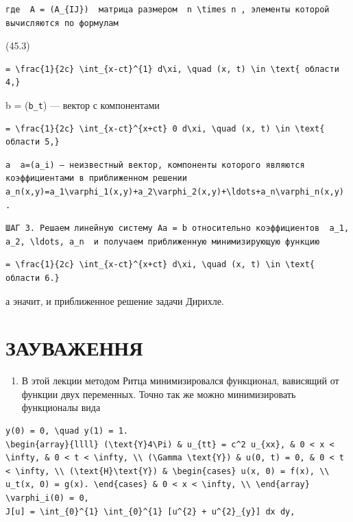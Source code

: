 \documentclass[
  ukrainian,
]{article}
\providecommand{\tightlist}{%
  \setlength{\itemsep}{0pt}\setlength{\parskip}{0pt}}
\begin{document}
\begin{verbatim}
где  A = (A_{IJ})  матрица размером  n \times n , элементы которой вычисляются по формулам
\end{verbatim}

(45.3)

\begin{verbatim}
= \frac{1}{2c} \int_{x-ct}^{1} d\xi, \quad (x, t) \in \text{ области 4,}
\end{verbatim}

b = (\texttt{b\_t}) --- вектор с компонентами

\begin{verbatim}
= \frac{1}{2c} \int_{x-ct}^{x+ct} 0 d\xi, \quad (x, t) \in \text{ области 5,}
\end{verbatim}

\begin{verbatim}
а  a=(a_i) — неизвестный вектор, компоненты которого являются коэффициентами в приближенном решении  a_n(x,y)=a_1\varphi_1(x,y)+a_2\varphi_2(x,y)+\ldots+a_n\varphi_n(x,y) .
\end{verbatim}

\begin{verbatim}
ШАГ 3. Решаем линейную систему Aa = b относительно коэффициентов  a_1, a_2, \ldots, a_n  и получаем приближенную минимизирующую функцию
\end{verbatim}

\begin{verbatim}
= \frac{1}{2c} \int_{x-ct}^{x+ct} d\xi, \quad (x, t) \in \text{ области 6.}
\end{verbatim}

а эначит, и приближенное решение задачи Дирихле.

\section{ЗАУВАЖЕННЯ}\label{ux437ux430ux443ux432ux430ux436ux435ux43dux43dux44f}

\begin{enumerate}
\def\labelenumi{\arabic{enumi}.}
\tightlist
\item
  В этой лекции методом Ритца минимизировался функционал, вависящий от
  функции двух переменных. Точно так же можно минимизировать функционалы
  вида
\end{enumerate}

\begin{verbatim}
y(0) = 0, \quad y(1) = 1.
\begin{array}{llll} (\text{Y}4\Pi) & u_{tt} = c^2 u_{xx}, & 0 < x < \infty, & 0 < t < \infty, \\ (\Gamma \text{Y}) & u(0, t) = 0, & 0 < t < \infty, \\ (\text{H}\text{Y}) & \begin{cases} u(x, 0) = f(x), \\ u_t(x, 0) = g(x). \end{cases} & 0 < x < \infty, \\ \end{array}
\varphi_i(0) = 0,
J[u] = \int_{0}^{1} \int_{0}^{1} [u^{2} + u^{2}_{y}] dx dy,
\end{verbatim}
\end{document}
